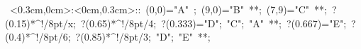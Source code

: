 %

\hbox{
\xy    <0.3cm,0cm>:<0cm,0.3cm>::
       (0,0)="A" ; (9,0)="B" **\dir{-}; 
       (7,9)="C" **\dir{-}; ?(0.15)*^!/8pt/{x};
       ?(0.65)*^!/8pt/{4}; ?(0.333)="D"; "C"; 
       "A" **\dir{-};  ?(0.667)="E"; 
       ?(0.4)*^!/8pt/{6};  ?(0.85)*^!/8pt/{3};
       "D"; "E" **\dir{-};
       \endxy}
	   
